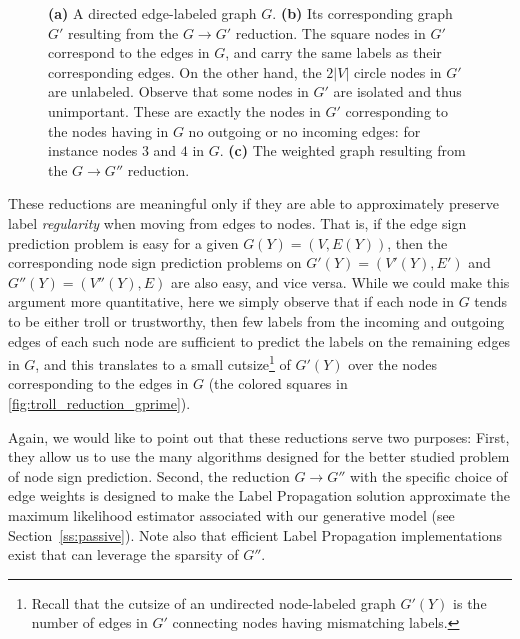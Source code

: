 \begin{figure}[t]
\begin{subfigure}[b]{0.36\textwidth}
  \end{subfigure}
  \caption{\label{f:etnr}
    \textbf{(a)} A directed edge-labeled graph $G$. \textbf{(b)} Its corresponding graph $G'$
    resulting from the $G\rightarrow G'$ reduction. The square nodes in $G'$ correspond to the
    edges in $G$, and carry the same labels as their corresponding edges. On the other hand, the
    $2|V|$ circle nodes in $G'$ are unlabeled. Observe that some nodes in $G'$ are isolated and
    thus unimportant. These are exactly the nodes in $G'$ corresponding to the nodes having in $G$
    no outgoing or no incoming edges: for instance nodes $3$ and $4$ in $G$. \textbf{(c)} The
    weighted graph resulting from the $G\rightarrow G''$ reduction.
  }
\end{figure}

These reductions are meaningful only if they are able to approximately preserve label
\emph{regularity} when moving from edges to nodes. That is, if the edge sign prediction problem is
easy for a given $G(Y) = (V,E(Y))$, then the corresponding node sign prediction problems on $G'(Y)
= (V'(Y),E')$ and $G''(Y) = (V''(Y),E)$ are also easy, and vice versa.  While we could make this
argument more quantitative, here we simply observe that if each node in $G$ tends to be either
troll or trustworthy, then few labels from the incoming and outgoing edges of each such node are
sufficient to predict the labels on the remaining edges in $G$, and this translates to a small
cutsize\footnote{Recall that the cutsize of an undirected node-labeled graph $G'(Y)$ is the number
of edges in $G'$ connecting nodes having mismatching labels.} of $G'(Y)$ over the nodes
corresponding to the edges in $G$ (the colored squares in \autoref{fig:troll_reduction_gprime}).

Again, we would like to point out that these reductions serve two purposes: First, they allow us to
use the many algorithms designed for the better studied problem of node sign prediction. Second,
the reduction $G\rightarrow G''$ with the specific choice of edge weights is designed to make the
Label Propagation solution approximate the maximum likelihood estimator associated with our
generative model (see Section~\ref{ss:passive}). Note also that efficient Label Propagation
implementations exist that can leverage the sparsity of $G''$.

